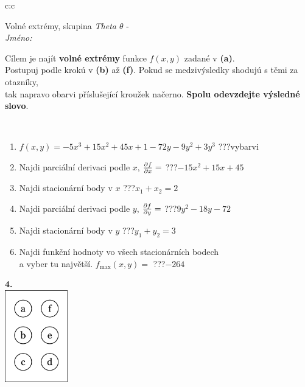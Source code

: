 \documentclass[10pt]{report}
\begin{document}
\begin{tabular}{c:c}
\begin{minipage}[c][104.5mm][t]{0.5\linewidth}
\begin{center}
\vspace{7mm}
{\huge Volné extrémy, skupina \textit{Theta $\theta$} -}\\[5mm]
\textit{Jméno:}\phantom{xxxxxxxxxxxxxxxxxxxxxxxxxxxxxxxxxxxxxxxxxxxxxxxxxxxxxxxxxxxxxxxxx}\\[5mm]
\begin{minipage}{0.95\linewidth}
\begin{center}
Cílem je najít \textbf{volné extrémy} funkce $f(x,y)$ zadané v \textbf{(a)}.\\Postupuj podle krokú v \textbf{(b)} až \textbf{(f)}. Pokud se medzivýsledky shodujú s těmi za otazníky,\\tak napravo obarvi příslušející kroužek načerno. \textbf{Spolu odevzdejte výsledné slovo}.
\end{center}
\end{minipage}
\\[1mm]
\begin{minipage}{0.79\linewidth}
\begin{center}
\begin{varwidth}{\linewidth}
\begin{enumerate}
\normalsize
\item $f(x,y)=-5x^3+15x^2+45x+1-72y-9y^2+3y^3$\quad \dotfill\; ???\;\dotfill \quad vybarvi
\item Najdi parciální derivaci podle $x$, $\pdv{f}{x}=$\quad \dotfill\; ???\;\dotfill \quad $-15x^2+15x+45$
\item Najdi stacionární body v $x$\quad \dotfill\; ???\;\dotfill \quad $x_1+x_2=2$
\item Najdi parciální derivaci podle $y$, $\pdv{f}{y}=$\quad \dotfill\; ???\;\dotfill \quad $9y^2-18y-72$
\item Najdi stacionární body v $y$\quad \dotfill\; ???\;\dotfill \quad $y_1+y_2=3$
\item Najdi funkční hodnoty vo všech stacionárních bodech \\ \phantom{xxxxxx} a vyber tu najvětší. $f_{\text{max}}(x,y)=$\quad \dotfill\; ???\;\dotfill \quad $-264$
\end{enumerate}
\end{varwidth}
\end{center}
\end{minipage}
\begin{minipage}{0.20\linewidth}
\begin{center}
{\Huge\bfseries 4.} \\[2mm]
\includegraphics[height=40mm]{../images/braille.png}

\end{center}
\end{minipage}
\end{center}
\end{minipage}
\end{tabular}
\end{document}

